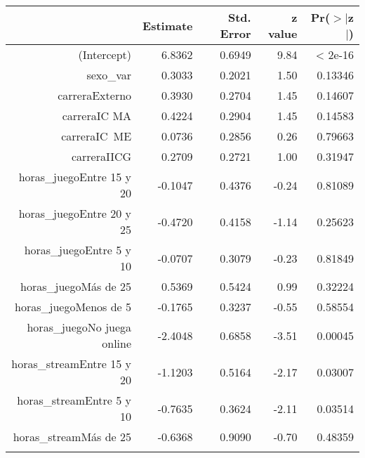 \documentclass[pdf]{beamer}
\begin{document}
\begin{frame}

\begin{center}
\begin{tiny}
    

\begin{table}[ht]
\centering
\begin{tabular}{rrrrr}
 \hline
& Estimate & Std. Error & z value & Pr($>$$|$z$|$) \\
 \hline
(Intercept)                                               &  6.8362  &    0.6949 &  9.84 & < 2e-16\\
sexo\_var &                                                   0.3033  &    0.2021  & 1.50  &0.13346\\
carreraExterno  &                                          0.3930      &0.2704   &1.45  &0.14607\\
carreraIC MA    &                                        0.4224   &   0.2904  & 1.45  &0.14583\\
carreraIC\ ME     &                                        0.0736     & 0.2856  & 0.26  &0.79663\\
carreraIICG        &                                        0.2709    &  0.2721  & 1.00 & 0.31947\\
horas\_juegoEntre 15 y 20       &                            -0.1047   &   0.4376  &-0.24 & 0.81089\\
horas\_juegoEntre 20 y 25     &                              -0.4720  &    0.4158 & -1.14 & 0.25623\\
horas\_juegoEntre 5 y 10       &                             -0.0707     & 0.3079 & -0.23  &0.81849\\
horas\_juegoMás de 25                    &                    0.5369    &  0.5424  & 0.99 & 0.32224\\
horas\_juegoMenos de 5             &                         -0.1765   &   0.3237 & -0.55 & 0.58554\\
horas\_juegoNo juega online   &                              -2.4048    &  0.6858  &-3.51 & 0.00045\\
horas\_streamEntre 15 y 20    &                              -1.1203 &     0.5164  &-2.17 & 0.03007\\
horas\_streamEntre 5 y 10      &                             -0.7635   &   0.3624  &-2.11 & 0.03514\\
horas\_streamMás de 25            &                          -0.6368 &     0.9090  &-0.70 & 0.48359\\
$$
\end{tabular}
\end{table}
\end{tiny}
\end{center}
\end{frame}
\end{document}
